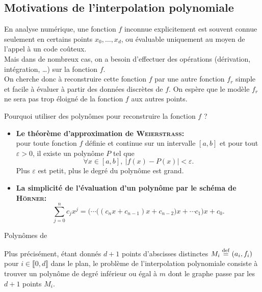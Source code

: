 
\subsection{Motivations de l'interpolation polynomiale}
En analyse numérique, une fonction $f$ inconnue explicitement est souvent connue seulement en certains points $x_0, \dots, x_d$, ou évaluable uniquement au moyen de l'appel à un code coûteux. \\
Mais dans de nombreux cas, on a besoin d'effectuer des opérations (dérivation, intégration, \dots) sur la fonction $f$. \\
On cherche donc à reconstruire cette fonction $f$ par une autre fonction $f_r$ simple et facile à évaluer à partir des données discrètes de $f$. On espère que le modèle $f_r$ ne sera pas trop éloigné de la fonction $f$ aux autres points.
\begin{center}
    Pourquoi utiliser des polynômes pour reconstruire la fonction $f$ ?    
\end{center}
\begin{itemize}
    \item \textbf{Le théorème d'approximation de \textsc{Weierstrass}:} \note \\
    pour toute fonction $f$ définie et continue sur un intervalle $[a, b]$ et pour tout $\varepsilon > 0$, il existe un polynôme $P$ tel que 
    $$\forall x \in [a, b],\ |f(x) - P(x)| < \varepsilon.$$
    Plus $\varepsilon$ est petit, plus le degré du polynôme est grand.
    \item \textbf{La simplicité de l'évaluation d'un polynôme par le schéma de \textsc{Hörner}:}
    $$\sum_{j=0}^n c_j x^j = \Big( \cdots \big( (c_n x + c_{n-1})x + c_{n-2} \big)x + \cdots c_1 \Big)x + c_0.$$
\end{itemize}

\begin{marginfigure}[-1cm]
    \centering
    \caption{Polynômes de }
\end{marginfigure}

Plus précisément, étant donnés $d+1$ points d'abscisses distinctes $M_i \overset{\mathrm{\tiny def}}{=} (a_i, f_i)$ pour $i \in \llbracket 0, d \rrbracket$ dans le plan, le problème de l'interpolation polynomiale consiste à trouver un polynôme de degré inférieur ou égal à $m$ dont le graphe passe par les $d+1$ points $M_i$.\\

